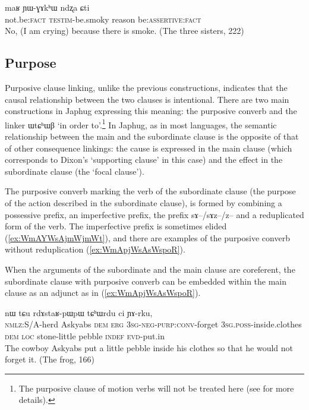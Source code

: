 \documentclass[oldfontcommands,oneside,a4paper,11pt]{article}
\newcommand{\ipa}[1]{{\phon \mbox{#1}}} %
\newcommand{\refb}[1]{(\ref{#1})}
\begin{document}
\begin{exe}
\ex \label{ex:YWGAkhW.ndzxa}
\gll
\ipa{maʁ}   	\ipa{ɲɯ-ɣɤkʰɯ}   	\ipa{ndʐa}   	\ipa{ɕti}   \\
not.be:\textsc{fact} \textsc{testim}-be.smoky reason be:\textsc{assertive}:\textsc{fact} \\
\glt No, (I am crying) because there is smoke. (The three sisters, 222) 
\end{exe} 
 

\subsection{Purpose} \label{sec:purposive}

Purposive clause linking, unlike the previous constructions, indicates that the causal relationship between the two clauses is intentional. There are two main constructions in Japhug expressing this meaning: the purposive converb and the linker \ipa{ɯtɕʰɯβ} `in order to'.\footnote{The purposive clause of motion verbs will not be treated here (see \citet{jacques13harmonization} for more details).} In Japhug, as in most languages, the semantic relationship between the main and the subordinate clause is the opposite of that of other consequence linkings: the cause is expressed in the main clause (which corresponds to Dixon's `supporting clause' in this case) and the effect in the subordinate clause (the `focal clause').

The purposive converb marking the verb of the subordinate clause (the purpose of the action described in the subordinate clause), is formed by combining a possessive prefix, an imperfective prefix, the prefix \ipa{sɤ}--/\ipa{sɤz}--/\ipa{z}-- and a reduplicated form of the verb. The imperfective prefix is sometimes elided \refb{ex:WmAYWsAjmWjmWt}, and there are examples of the purposive converb without reduplication \refb{ex:WmApjWsAsWspoR}.  

When the arguments of the subordinate and the main clause are coreferent, the subordinate clause with purposive converb can be embedded within the main clause as an adjunct as in \refb{ex:WmApjWsAsWspoR}.
 
\begin{exe}
\ex \label{ex:WmAYWsAjmWjmWt}
\gll
[\ipa{kɯ-lɤɣ}   	\ipa{acɤβ}   	\ipa{nɯ}   	\ipa{kɯ}   	\ipa{\textbf{ɯ-mɤ-sɤ-jmɯ\textasciitilde{}jmɯt}},]   	\ipa{ɯ-pʰɯŋgɯ}   	\ipa{nɯ}   	\ipa{tɕu}   	\ipa{rdɤstaʁ-pɯpɯ}   	\ipa{tɕʰɯrdu}   	\ipa{ci}  \ipa{ɲɤ-rku,}\\
 \textsc{nmlz}:S/A-herd Askyabs \textsc{dem} \textsc{erg}  \textsc{3sg-neg-purp:conv}-forget \textsc{3sg.poss}-inside.clothes \textsc{dem} \textsc{loc} stone-little pebble \textsc{indef}
 \textsc{evd}-put.in\\
\glt The cowboy Askyabs put a little pebble inside his clothes so that he would not forget it. (The frog, 166)
\end{exe}
 
\end{document}
